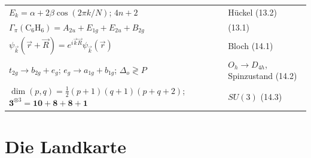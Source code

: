 \begin{merksatz}
\begin{center}
{\begin{tabular}{@{}P{4.8cm}P{3.8cm}@{}}
$E_k = \alpha + 2\beta\cos(2\pi k/N)$; $4n + 2$ & Hückel (13.2)\\
$\Gamma_\pi(\mathrm{C_6H_6}) = A_{2u} + E_{1g} + E_{2u} + B_{2g}$ & (13.1)\\
$\psi_{\vec k}(\vec r + \vec R) = e^{i\vec k\vec R}\psi_{\vec k}(\vec r)$ & Bloch (14.1)\\
$t_{2g}\to b_{2g} + e_g$; $e_g\to a_{1g} + b_{1g}$; $\Delta_o\gtrless P$ & $O_h\to D_{4h}$, Spinzustand (14.2)\\
$\dim(p, q) = \frac12(p + 1)(q + 1)(p + q + 2)$; $\mathbf 3^{\otimes3} = \mathbf{10} + \mathbf 8 + \mathbf 8 + \mathbf 1$ & $SU(3)$ (14.3)\\
\bottomrule
\end{tabular}}
\end{center}
\end{merksatz}

\section{Die Landkarte}

